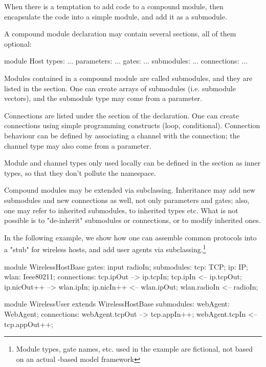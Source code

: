 \begin{note}
    When there is a temptation to add code to a compound module,
    then encapsulate the code into a simple module, and add it as
    a submodule.
\end{note}

A compound module declaration may contain several sections,
all of them optional:

\begin{ned}
module Host
{
   types:
       ...
   parameters:
       ...
   gates:
       ...
   submodules:
       ...
   connections:
       ...
}
\end{ned}

Modules contained in a compound module are called submodules, and they are
listed in the  section. One can create arrays of submodules
(i.e. submodule vectors), and the submodule type may come from a parameter.

Connections are listed under the  section of the
declaration. One can create connections using simple programming constructs
(loop, conditional). Connection behaviour can be defined by associating a
channel with the connection; the channel type may also come from a
parameter.

Module and channel types only used locally can be defined in the
 section as inner types, so that they don't pollute the
namespace.

Compound modules may be extended via subclassing. Inheritance may add new
submodules and new connections as well, not only parameters and gates;
also, one may refer to inherited submodules, to inherited types etc. What
is not possible is to "de-inherit" submodules or connections, or to modify
inherited ones.

In the following example, we show how one can assemble common protocols
into a "stub" for wireless hosts, and add user agents via
subclassing.\footnote{Module types, gate names, etc. used in the example
are fictional, not based on an actual {\opp}-based model framework}

\begin{ned}
module WirelessHostBase
{
   gates:
       input radioIn;
   submodules:
       tcp: TCP;
       ip: IP;
       wlan: Ieee80211;
   connections:
       tcp.ipOut --> ip.tcpIn;
       tcp.ipIn <-- ip.tcpOut;
       ip.nicOut++ --> wlan.ipIn;
       ip.nicIn++ <-- wlan.ipOut;
       wlan.radioIn <-- radioIn;
}

module WirelessUser extends WirelessHostBase
{
   submodules:
       webAgent: WebAgent;
   connections:
       webAgent.tcpOut --> tcp.appIn++;
       webAgent.tcpIn <-- tcp.appOut++;
}
\end{ned}

